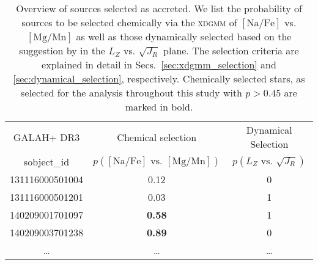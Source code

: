 \begin{table}
\centering
\caption{Overview of sources selected as accreted. We list the probability of sources to be selected chemically via the \textsc{xdgmm} of $\mathrm{[Na/Fe]}$ vs. $\mathrm{[Mg/Mn]}$ as well as those dynamically selected based on the suggestion by \citet{Feuillet2021} in the $L_Z$ vs. $\sqrt{J_R}$ plane. The selection criteria are explained in detail in Secs.~\ref{sec:xdgmm_selection} and \ref{sec:dynamical_selection}, respectively. Chemically selected stars, as selected for the analysis throughout this study with $p > 0.45$ are marked in bold.}
\label{tab:xdgmm_dynamical_selection}
\setlength{\tabcolsep}{0.6em}
\begin{tabular}{ccc}
\hline
GALAH+ DR3 & Chemical selection & Dynamical Selection \\
sobject\_id & $p (\mathrm{[Na/Fe]}\text{ vs. }\mathrm{[Mg/Mn]})$ & $p (L_Z\text{ vs. }\sqrt{J_R})$ \\
\hline
131116000501004 & 0.12 & 0 \\
131116000501201 & 0.03 & 1 \\
140209001701097 & \textbf{0.58} & 1 \\
140209003701238 & \textbf{0.89} & 0 \\
\dots  & \dots  & \dots  \\
\hline
\end{tabular}
\end{table}

